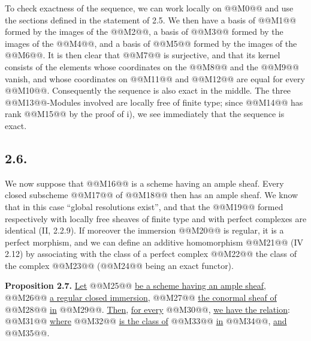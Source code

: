 To check exactness of the sequence, we can work locally on @@M0@@ and use the sections defined in the statement of 2.5. We then have a basis of @@M1@@ formed by the images of the @@M2@@, a basis of @@M3@@ formed by the images of the @@M4@@, and a basis of @@M5@@ formed by the images of the @@M6@@. It is then clear that @@M7@@ is surjective, and that its kernel consists of the elements whose coordinates on the @@M8@@ and the @@M9@@ vanish, and whose coordinates on @@M11@@ and @@M12@@ are equal for every @@M10@@. Consequently the sequence is also exact in the middle. The three @@M13@@-Modules involved are locally free of finite type; since @@M14@@ has rank @@M15@@ by the proof of i), we see immediately that the sequence is exact.

\subsection*{2.6.}
We now suppose that @@M16@@ is a scheme having an ample sheaf. Every closed subscheme @@M17@@ of @@M18@@ then has an ample sheaf. We know that in this case ``global resolutions exist'', and that the @@M19@@ formed respectively with locally free sheaves of finite type and with perfect complexes are identical (II, 2.2.9). If moreover the immersion @@M20@@ is regular, it is a perfect morphism, and we can define an additive homomorphism @@M21@@ (IV 2.12) by associating with the class of a perfect complex @@M22@@ the class of the complex @@M23@@ (@@M24@@ being an exact functor).

\textbf{Proposition 2.7.} \uline{Let} @@M25@@ \uline{be a scheme having an ample sheaf}, @@M26@@ \uline{a regular closed immersion}, @@M27@@ \uline{the conormal sheaf of} @@M28@@ \uline{in} @@M29@@. \uline{Then}, \uline{for every} @@M30@@, \uline{we have the relation}:
@@M31@@
\uline{where} @@M32@@ \uline{is the class of} @@M33@@ \uline{in} @@M34@@, \uline{and} @@M35@@.
